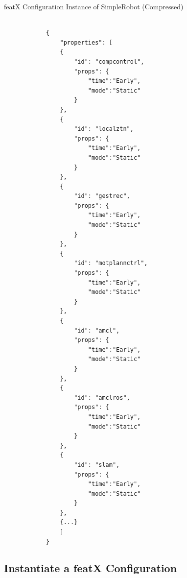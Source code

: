 \documentclass{article}
\newenvironment{longlisting}{\captionsetup{type=listing}}{}
\begin{document}
\begin{minipage}{.45\textwidth}
	\begin{longlisting}
		\caption{featX Configuration Instance of SimpleRobot (Compressed)}
		\begin{verbatim}
			
			{
				"properties": [
				{
					"id": "compcontrol",
					"props": {
						"time":"Early",
						"mode":"Static"
					}
				},
				{
					"id": "localztn",
					"props": {
						"time":"Early",
						"mode":"Static"
					}
				},
				{
					"id": "gestrec",
					"props": {
						"time":"Early",
						"mode":"Static"
					}
				},
				{
					"id": "motplannctrl",
					"props": {
						"time":"Early",
						"mode":"Static"
					}
				},
				{
					"id": "amcl",
					"props": {
						"time":"Early",
						"mode":"Static"
					}
				},
				{
					"id": "amclros",
					"props": {
						"time":"Early",
						"mode":"Static"
					}
				},
				{
					"id": "slam",
					"props": {
						"time":"Early",
						"mode":"Static"
					}
				},
				{...}
				]
			}
		\end{verbatim}
		\label{conf-schema}
	\end{longlisting}
\end{minipage}

\subsection{Instantiate a featX Configuration}
\end{document}
